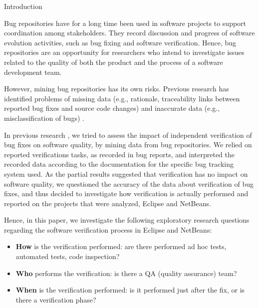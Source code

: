 \begin{section}{Introduction}

Bug repositories have for a long time been used in software projects to support coordination among stakeholders. They record discussion and progress of software evolution activities, such as bug fixing and software verification. Hence, bug repositories are an opportunity for researchers who intend to investigate issues related to the quality of both the product and the process of a software development team.


However, mining bug repositories has its own risks. Previous research has identified problems of missing data (e.g., rationale, traceability links between reported bug fixes and source code changes) and inaccurate data (e.g., misclassification of bugs) \cite{Aranda2009}. %

  In previous research \cite{Souza2011}, we tried to assess the impact of independent verification of bug fixes on software quality, by mining data from bug repositories. 
  We relied on reported verifications tasks, as recorded in bug reports, and interpreted the recorded data according to the documentation for the specific bug tracking system used.
  As the partial results suggested that verification has no impact on software quality, we questioned the accuracy of the data about verification of bug fixes, and thus decided to investigate how verification is actually performed and reported on the projects that were analyzed, Eclipse and NetBeans.
	
	Hence, in this paper, we investigate the following exploratory research questions regarding the software verification process in Eclipse and NetBeans:

	\begin{itemize}
		\item \textbf{How} is the verification performed: are there performed ad hoc tests, automated tests, code inspection?
		\item \textbf{Who} performs the verification: is there a QA (quality assurance) team? 
		\item \textbf{When} is the verification performed: is it performed just after the fix, or is there a verification phase?
	\end{itemize}


\end{section}
